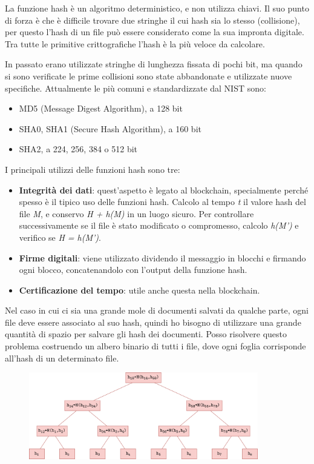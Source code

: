 La funzione hash è un algoritmo deterministico, e non utilizza chiavi. Il suo punto di forza è che è difficile trovare due stringhe il cui hash sia lo stesso (collisione), per questo l'hash di un file può essere considerato come la sua impronta digitale. Tra tutte le primitive crittografiche l'hash è la più veloce da calcolare.

\vspace{5mm}

In passato erano utilizzate stringhe di lunghezza fissata di pochi bit, ma quando si sono verificate le prime collisioni sono state abbandonate e utilizzate nuove specifiche. Attualmente le più comuni e standardizzate dal NIST sono:
\begin{itemize}
    \item MD5 (Message Digest Algorithm), a 128 bit
    \item SHA0, SHA1 (Secure Hash Algorithm), a 160 bit
    \item SHA2, a 224, 256, 384 o 512 bit
\end{itemize}
I principali utilizzi delle funzioni hash sono tre:
\begin{itemize}
    \item \textbf{Integrità dei dati}: quest'aspetto è legato al blockchain, specialmente perché spesso è il tipico uso delle funzioni hash. Calcolo al tempo \textit{t} il valore hash del file \textit{M}, e conservo \textit{H + h(M)} in un luogo sicuro. Per controllare successivamente se il file è stato modificato o compromesso, calcolo \textit{h(M')} e verifico se \textit{H = h(M')}.
    \item \textbf{Firme digitali}: viene utilizzato dividendo il messaggio in blocchi e firmando ogni blocco, concatenandolo con l'output della funzione hash.
    \item \textbf{Certificazione del tempo}: utile anche questa nella blockchain. 
\end{itemize}
Nel caso in cui ci sia una grande mole di documenti salvati da qualche parte, ogni file deve essere associato al suo hash, quindi ho bisogno di utilizzare una grande quantità di spazio per salvare gli hash dei documenti. Posso risolvere questo problema costruendo un albero binario di tutti i file, dove ogni foglia corrisponde all'hash di un determinato file. 

\begin{figure}[hbt!]
    \centering
    \includegraphics[width=10cm]{./Images/cap1/1.1.png}
\end{figure}

